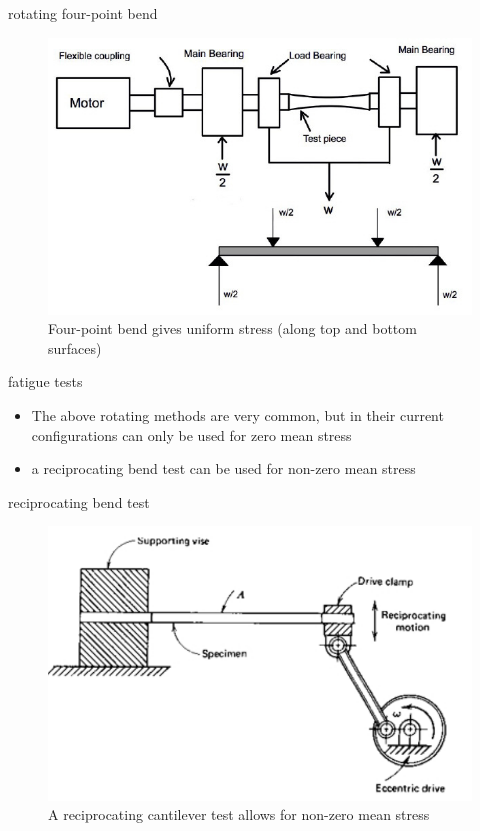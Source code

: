 \documentclass[10pt]{beamer}
\begin{document}
\begin{frame}{rotating four-point bend}
	\begin{figure}
	\centering
	\includegraphics[width=0.7\linewidth]{../Figures/Rotating_Bending_Machine}
	\caption{Four-point bend gives uniform stress (along top and bottom surfaces)}
	\label{fig:Rotating_Bending_Machine}
	\end{figure}
\end{frame}

\begin{frame}{fatigue tests}
	\begin{itemize}[<+->]
		\item The above rotating methods are very common, but in their current configurations can only be used for zero mean stress
		\item a reciprocating bend test can be used for non-zero mean stress
	\end{itemize}
\end{frame}

\begin{frame}{reciprocating bend test}
	\begin{figure}
	\centering
	\includegraphics[width=0.7\linewidth]{"../Figures/reciprocating_cantilever"}
	\caption{A reciprocating cantilever test allows for non-zero mean stress}
	\label{fig:reciprocatingcantilever}
\end{figure}
\end{frame}
\end{document}
